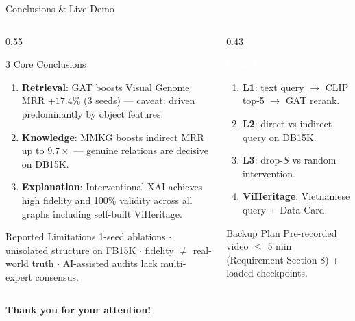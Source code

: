 \documentclass[aspectratio=169,10pt]{beamer}
\begin{document}
\begin{frame}{Conclusions \& Live Demo}
  \begin{columns}[t]
    \begin{column}{0.55\textwidth}
      \begin{block}{3 Core Conclusions}\footnotesize
        \begin{enumerate}
          \item \textbf{Retrieval}: GAT boosts Visual Genome MRR $+17.4\%$ (3 seeds) --- caveat: driven predominantly by object features.
          \item \textbf{Knowledge}: MMKG boosts indirect MRR up to $\mathbf{9.7\times}$ --- genuine relations are decisive on DB15K.
          \item \textbf{Explanation}: Interventional XAI achieves high fidelity and 100\% validity across all graphs including self-built ViHeritage.
        \end{enumerate}
      \end{block}
      \vspace{0.04cm}
      \begin{block}{Reported Limitations}\scriptsize
        1-seed ablations $\cdot$ unisolated structure on FB15K $\cdot$ fidelity $\ne$ real-world truth $\cdot$ AI-assisted audits lack multi-expert consensus.
      \end{block}
    \end{column}
    \begin{column}{0.43\textwidth}
      \begin{block}{\textcolor{white}{Demo Outline (4--5 min)}}\footnotesize
        \begin{enumerate}
          \item \textbf{L1}: text query $\rightarrow$ CLIP top-5 $\rightarrow$ GAT rerank.
          \item \textbf{L2}: direct vs indirect query on DB15K.
          \item \textbf{L3}: drop-$S$ vs random intervention.
          \item \textbf{ViHeritage}: Vietnamese query + Data Card.
        \end{enumerate}
      \end{block}
      \vspace{0.04cm}
      \begin{exampleblock}{Backup Plan}\scriptsize
        Pre-recorded video $\le$ 5 min (Requirement Section 8) + loaded checkpoints.
      \end{exampleblock}
    \end{column}
  \end{columns}
  \vspace{0.20cm}
  \begin{center}
    {\normalsize\bfseries\color{HCMUSBlue} Thank you for your attention!}
  \end{center}
\end{frame}
\end{document}
